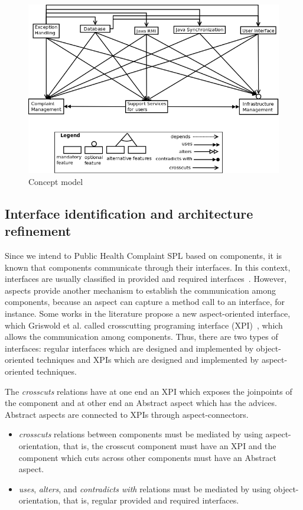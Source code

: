 \documentclass[11pt,twoside]{article}
\begin{document}
\begin{figure}[h!t!b!]
   \centering
    \includegraphics[scale=0.35]{figs/merge-fm-aofv-v01.png}
   \caption{Concept model}
   \label{fig:conceptModel}
\end{figure}



\subsection{Interface identification and architecture refinement}
\label{sec:archRefinement}
Since we intend to Public Health Complaint SPL based on components, it is known that components communicate through their interfaces.
In this context, interfaces are usually classified in provided and required interfaces~\cite{Szyperski:2002:CS}. However, aspects provide
another mechanism to establish the communication among components, because an aspect can capture a method call to an interface, for
instance. Some works in the literature propose a new aspect-oriented interface, which Griswold et al. called
crosscutting programing interface (XPI)~\cite{Griswold:2006:MSD}, which allows the communication among components. Thus, there are two types
of interfaces: regular interfaces which are designed and implemented by object-oriented techniques and XPIs which
are designed and implemented by aspect-oriented techniques.

The \textit{crosscuts} relations have at one end an XPI which exposes the joinpoints of the component and at other end an Abstract aspect
which has the advices. Abstract aspects are connected to XPIs through aspect-connectors.


\begin{itemize}
 \item \textit{crosscuts} relations between components must be mediated by using aspect-orientation, that is, the crosscut component must
have an XPI and the component which cuts across other components must have an Abstract aspect.
\item \textit{uses}, \textit{alters}, and \textit{contradicts with} relations must be mediated by using object-orientation, that is,
regular provided and required interfaces.
\end{itemize}
\end{document}

